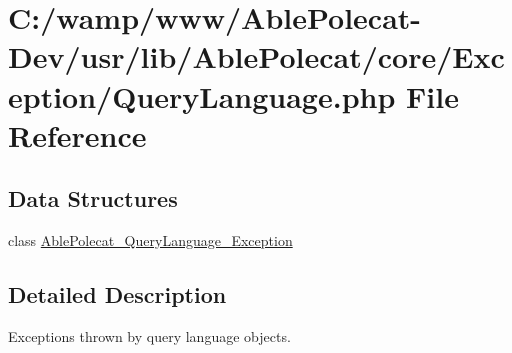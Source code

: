 \hypertarget{_exception_2_query_language_8php}{}\section{C\+:/wamp/www/\+Able\+Polecat-\/\+Dev/usr/lib/\+Able\+Polecat/core/\+Exception/\+Query\+Language.php File Reference}
\label{_exception_2_query_language_8php}
\subsection*{Data Structures}
\begin{DoxyCompactItemize}
\item 
class \hyperlink{class_able_polecat___query_language___exception}{Able\+Polecat\+\_\+\+Query\+Language\+\_\+\+Exception}
\end{DoxyCompactItemize}


\subsection{Detailed Description}
Exceptions thrown by query language objects. 